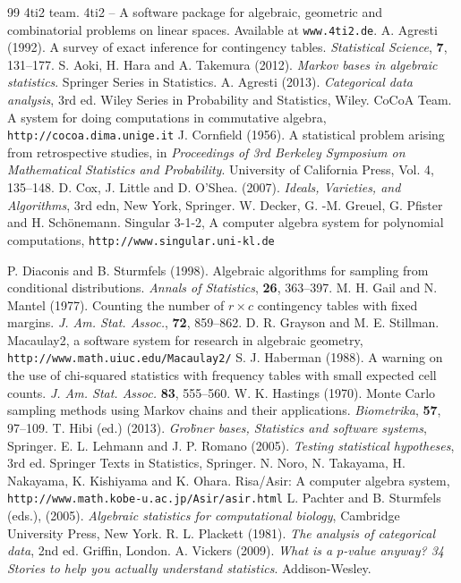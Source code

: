 \documentclass[12pt]{article}
\theoremstyle{definition}
\begin{document}
\begin{thebibliography}{99}
4ti2 team. 4ti2 -- A software package for algebraic, geometric and 
combinatorial problems on linear spaces. Available at {\tt www.4ti2.de}.
%
A. Agresti (1992).
A survey of exact inference for contingency tables. {\it Statistical
	Science}, {\bf 7}, 131--177.
%
S. Aoki, H. Hara and A. Takemura (2012).
{\it Markov bases in algebraic statistics}. 
Springer Series in Statistics.
%
A. Agresti (2013).
{\it Categorical data analysis}, 3rd ed. Wiley Series in Probability and
	Statistics, Wiley.
%
CoCoA Team. A system for doing computations in commutative algebra,
	\verb|http://cocoa.dima.unige.it|
%
J. Cornfield (1956).
A statistical problem arising from retrospective studies, in {\it
	Proceedings of 3rd Berkeley Symposium on Mathematical Statistics
	and Probability}. University of California Press, Vol. 4, 135--148.
%
D. Cox, J. Little and D. O'Shea. (2007).
{\it Ideals, Varieties, and Algorithms}, 3rd edn, New York, Springer.
%
W. Decker, G. -M. Greuel, G. Pfister and H. Sch\"onemann. Singular
	3-1-2, A computer algebra system for polynomial computations,
	\verb|http://www.singular.uni-kl.de|

%
P. Diaconis and B. Sturmfels (1998).
Algebraic algorithms for sampling from conditional distributions. {\it
	Annals of Statistics}, {\bf 26}, 363--397.
%
M. H. Gail and N. Mantel (1977).
Counting the number of $r\times c$ contingency tables with fixed
	margins. {\it J. Am. Stat. Assoc.}, {\bf 72}, 859--862. 
%
D. R. Grayson and M. E. Stillman. Macaulay2, a software system for
		research in algebraic geometry,
		\verb|http://www.math.uiuc.edu/Macaulay2/|
%
S. J. Haberman (1988).
A warning on the use of chi-squared statistics with frequency tables
	with small expected cell counts. {\it J. Am. Stat. Assoc.} {\bf
	83}, 555--560.
%
W. K. Hastings (1970).
Monte Carlo sampling methods using Markov chains and their
	applications. {\it Biometrika}, {\bf 57}, 97--109.
%
T. Hibi (ed.) (2013). 
{\it Gro\"bner bases, Statistics and software systems}, 
Springer.
%
E. L. Lehmann and J. P. Romano (2005).
{\it Testing statistical hypotheses}, 3rd ed. Springer Texts in
	Statistics, Springer.
%
N. Noro, N. Takayama, H. Nakayama, K. Kishiyama and K. Ohara. Risa/Asir:
	A computer algebra system,
	\verb|http://www.math.kobe-u.ac.jp/Asir/asir.html|
%
L. Pachter and B. Sturmfels (eds.), (2005).
{\it Algebraic statistics for computational biology}, Cambridge
	University Press, New York.
%
R. L. Plackett (1981).
{\it The analysis of categorical data}, 2nd ed. Griffin, London.
%
A. Vickers (2009).
{\it What is a $p$-value anyway? 34 Stories to help you actually
	understand statistics}. Addison-Wesley.
%
\end{thebibliography}
\end{document}
